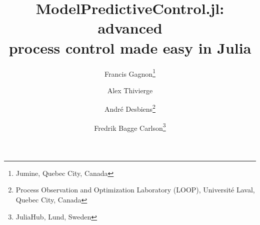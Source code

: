 \documentclass[twocolumn]{article}
\begin{document}
\title{ModelPredictiveControl.jl: advanced\\process control made easy in Julia}

\author{Francis Gagnon\thanks{Jumine, Quebec City, Canada} \and Alex Thivierge\footnotemark[1] \and André Desbiens\thanks{Process Observation and Optimization Laboratory (LOOP), Université Laval, Quebec City, Canada} \and Fredrik Bagge Carlson\thanks{JuliaHub, Lund, Sweden}}





\end{document}
